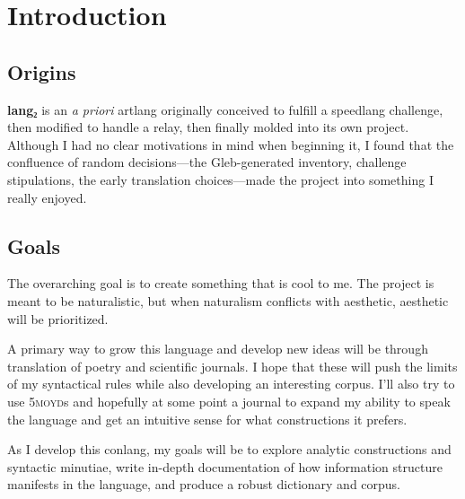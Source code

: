 \documentclass[fontsize=12pt,twoside=false,numbers=noenddot]{kaobook}
\title[A Grammar of \langname{}]{\huge \langname{}}
\subtitle{grammar of a constructed language}
\author[kilenc]{\large Seth Thompson \\ \small \textit{aka} kilenc}
\date{\small \today}
\newcommand{\langname}{\textbf{lang₂}}
\newcommand{\tsc}[1]{\textsc{#1}}
\begin{document}
\frontmatter

\maketitle
{}

\setlength{\textheight}{23cm} %
\etocstandarddisplaystyle %
\etocstandardlines %
\tableofcontents 


\setchapterpreamble[u]{\margintoc}
\chapter{Introduction}
\section{Origins}
\langname{} is an \emph{a priori} artlang originally conceived to fulfill a speedlang challenge, then modified to handle a relay, then finally molded into its own project. Although I had no clear motivations in mind when beginning it, I found that the confluence of random decisions---the Gleb-generated inventory, challenge stipulations, the early translation choices---made the project into something I really enjoyed.

\section{Goals}
The overarching goal is to create something that is cool to me. The project is meant to be naturalistic, but when naturalism conflicts with aesthetic, aesthetic will be prioritized.

A primary way to grow this language and develop new ideas will be through translation of poetry and scientific journals. I hope that these will push the limits of my syntactical rules while also developing an interesting corpus. I'll also try to use \tsc{5moyd}s and hopefully at some point a journal to expand my ability to speak the language and get an intuitive sense for what constructions it prefers.

As I develop this conlang, my goals will be to explore analytic constructions and syntactic minutiae, write in-depth documentation of how information structure manifests in the language, and produce a robust dictionary and corpus.
\end{document}
